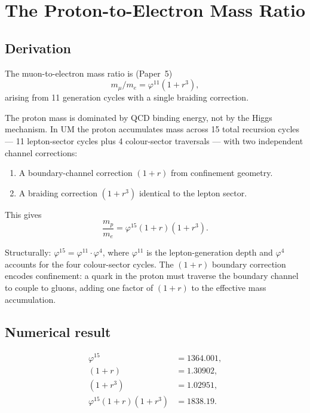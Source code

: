 \documentclass[12pt]{article}
\begin{document}
\section{The Proton-to-Electron Mass Ratio}

\subsection{Derivation}

The muon-to-electron mass ratio is (Paper~5)
\begin{equation}
  m_\mu / m_e = \varphi^{11}(1+r^3),
\end{equation}
arising from 11 generation cycles with a single braiding correction.

The proton mass is dominated by QCD binding energy, not by the Higgs
mechanism. In UM the proton accumulates mass across 15 total
recursion cycles — 11 lepton-sector cycles plus 4 colour-sector
traversals — with two independent channel corrections:

\begin{enumerate}
  \item A boundary-channel correction $(1+r)$ from confinement
        geometry.
  \item A braiding correction $(1+r^3)$ identical to the lepton
        sector.
\end{enumerate}

This gives
\begin{equation}
  \frac{m_p}{m_e}
    = \varphi^{15}(1+r)(1+r^3).
  \label{eq:mpme}
\end{equation}

Structurally: $\varphi^{15} = \varphi^{11} \cdot \varphi^{4}$,
where $\varphi^{11}$ is the lepton-generation depth and $\varphi^4$
accounts for the four colour-sector cycles. The $(1+r)$ boundary
correction encodes confinement: a quark in the proton must traverse
the boundary channel to couple to gluons, adding one factor of
$(1+r)$ to the effective mass accumulation.

\subsection{Numerical result}

\begin{align}
  \varphi^{15} &= 1364.001,\\
  (1+r)        &= 1.30902,\\
  (1+r^3)      &= 1.02951,\\
  \varphi^{15}(1+r)(1+r^3) &= 1838.19.
\end{align}
\end{document}
